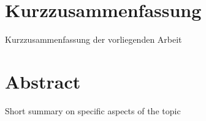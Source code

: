 \thispagestyle{plain}								%

\section*{Kurzzusammenfassung}			%

Kurzzusammenfassung der vorliegenden Arbeit

\section*{Abstract}									%

Short summary on specific aspects of the topic